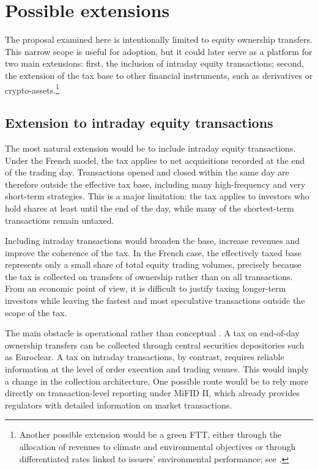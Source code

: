 \documentclass[../../main]{subfiles}
\begin{document}
\section{Possible extensions}

The proposal examined here is intentionally limited to equity ownership transfers. This narrow scope is useful for adoption, but it could later serve as a platform for two main extensions: first, the inclusion of intraday equity transactions; second, the extension of the tax base to other financial instruments, such as derivatives or crypto-assets.\footnote{Another possible extension would be a green FTT, either through the allocation of revenues to climate and environmental objectives or through differentiated rates linked to issuers' environmental performance; see \citep{CapelleBlancardGreenFTT}.}

\subsection{Extension to intraday equity transactions}

The most natural extension would be to include intraday equity transactions. Under the French model, the tax applies to net acquisitions recorded at the end of the trading day. Transactions opened and closed within the same day are therefore outside the effective tax base, including many high-frequency and very short-term strategies. This is a major limitation: the tax applies to investors who hold shares at least until the end of the day, while many of the shortest-term transactions remain untaxed.

Including intraday transactions would broaden the base, increase revenues and improve the coherence of the tax. In the French case, the effectively taxed base represents only a small share of total equity trading volumes, precisely because the tax is collected on transfers of ownership rather than on all transactions. From an economic point of view, it is difficult to justify taxing longer-term investors while leaving the fastest and most speculative transactions outside the scope of the tax.

The main obstacle is operational rather than conceptual \citep{CapelleBlancard2024FrenchFTT}. A tax on end-of-day ownership transfers can be collected through central securities depositories such as Euroclear. A tax on intraday transactions, by contrast, requires reliable information at the level of order execution and trading venues. This would imply a change in the collection architecture. One possible route would be to rely more directly on transaction-level reporting under MiFID II, which already provides regulators with detailed information on market transactions.
\end{document}
